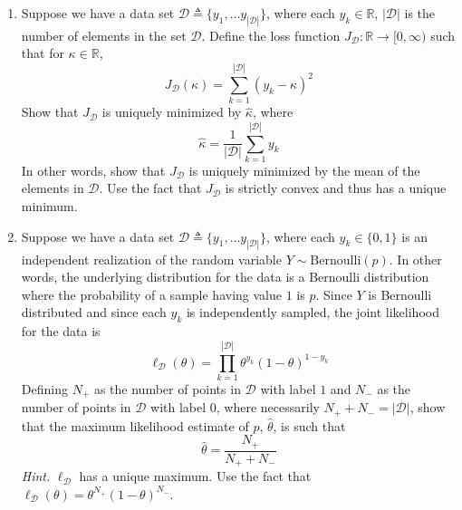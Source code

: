 \documentclass{article}
\numberwithin{equation}{section}
\begin{document}
\begin{enumerate}
    \item
    Suppose we have a data set $ \mathcal{D} \triangleq \{y_1,
    \ldots y_{|\mathcal{D}|}\} $, where each $ y_k \in \mathbb{R} $,
    $ |\mathcal{D}| $ is the number of elements in the set $ \mathcal{D} $.
    Define the loss function $ J_\mathcal{D} : \mathbb{R}
    \rightarrow [0, \infty) $ such that for $ \kappa \in \mathbb{R} $,
    \begin{equation*}
        J_\mathcal{D}(\kappa) = \sum_{k = 1}^{|\mathcal{D}|}(y_k - \kappa)^2
    \end{equation*}
    Show that $ J_\mathcal{D} $ is uniquely minimized by $ \hat{\kappa} $, where
    \begin{equation*}
        \hat{\kappa} = \frac{1}{|\mathcal{D}|}\sum_{k = 1}^{|\mathcal{D}|}y_k
    \end{equation*}
    In other words, show that $ J_\mathcal{D} $ is uniquely minimized by the
    mean of the elements in $ \mathcal{D} $. Use the fact that $ J_\mathcal{D} $
    is strictly convex and thus has a unique minimum.

    \item
    Suppose we have a data set $ \mathcal{D} \triangleq \{y_1, \ldots
    y_{|\mathcal{D}|}\} $, where each $ y_k \in \{0, 1\} $ is an independent
    realization of the random variable $ Y \sim \mathrm{Bernoulli}(p) $. In
    other words, the underlying distribution for the data is a Bernoulli
    distribution where the probability of a sample having value $ 1 $ is $ p $.
    Since $ Y $ is Bernoulli distributed and since each $ y_k $ is independently
    sampled, the joint likelihood for the data is
    \begin{equation*}
        \ell_\mathcal{D}(\theta) = \prod_{k = 1}^{|\mathcal{D}|}
        \theta^{y_k}(1 - \theta)^{1 - y_k}
    \end{equation*}
    Defining $ N_+ $ as the number of points in $ \mathcal{D} $ with label $ 1 $
    and $ N_- $ as the number of points in $ \mathcal{D} $ with label $ 0 $,
    where necessarily $ N_+ + N_- = |\mathcal{D}| $, show that the maximum
    likelihood estimate of $ p $, $ \hat{\theta} $, is such that
    \begin{equation*}
        \hat{\theta} = \frac{N_+}{N_+ + N_-}
    \end{equation*}
    \textit{Hint.} $ \ell_\mathcal{D} $ has a unique
    maximum. Use the fact that $ \ell_\mathcal{D}(\theta) =
    \theta^{N_+}(1 - \theta)^{N_-} $.


\end{enumerate}
\end{document}
